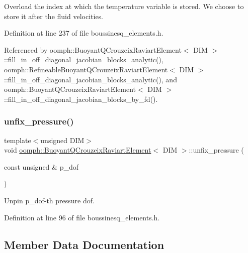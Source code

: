 Overload the index at which the temperature variable is stored. We choose to store it after the fluid velocities. 



Definition at line 237 of file boussinesq\+\_\+elements.\+h.



Referenced by oomph\+::\+Buoyant\+Q\+Crouzeix\+Raviart\+Element$<$ D\+I\+M $>$\+::fill\+\_\+in\+\_\+off\+\_\+diagonal\+\_\+jacobian\+\_\+blocks\+\_\+analytic(), oomph\+::\+Refineable\+Buoyant\+Q\+Crouzeix\+Raviart\+Element$<$ D\+I\+M $>$\+::fill\+\_\+in\+\_\+off\+\_\+diagonal\+\_\+jacobian\+\_\+blocks\+\_\+analytic(), and oomph\+::\+Buoyant\+Q\+Crouzeix\+Raviart\+Element$<$ D\+I\+M $>$\+::fill\+\_\+in\+\_\+off\+\_\+diagonal\+\_\+jacobian\+\_\+blocks\+\_\+by\+\_\+fd().

\mbox{\label{classoomph_1_1BuoyantQCrouzeixRaviartElement_a9468f7a594a5b9a9a07d3bf27dbcff45}} 
\subsubsection{\texorpdfstring{unfix\+\_\+pressure()}{unfix\_pressure()}}
{\footnotesize\ttfamily template$<$unsigned D\+IM$>$ \\
void \hyperlink{classoomph_1_1BuoyantQCrouzeixRaviartElement}{oomph\+::\+Buoyant\+Q\+Crouzeix\+Raviart\+Element}$<$ D\+IM $>$\+::unfix\+\_\+pressure (\begin{DoxyParamCaption}\item[{const unsigned \&}]{p\+\_\+dof }\end{DoxyParamCaption})\hspace{0.3cm}{\ttfamily [inline]}}



Unpin p\+\_\+dof-\/th pressure dof. 



Definition at line 96 of file boussinesq\+\_\+elements.\+h.



\subsection{Member Data Documentation}
\mbox{\label{classoomph_1_1BuoyantQCrouzeixRaviartElement_a3214e603f9b4108348c6a9abcede67ac}} 
